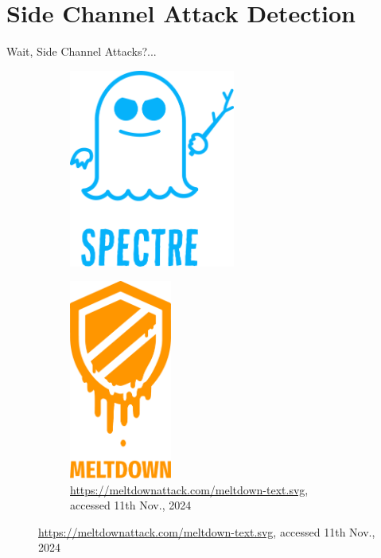 \documentclass[aspectratio=169]{beamer}
\begin{document}
\section{Side Channel Attack Detection}
\begin{frame}{Wait, Side Channel Attacks?...}
    \begin{figure}
        \begin{subfigure}[]{0.45\textwidth}
            \begin{center}
                \includegraphics[width=0.6\textwidth]{images/spectre.pdf}
            \end{center}
        \end{subfigure}
        \begin{subfigure}[]{0.45\textwidth}
            \begin{center}
                \includegraphics[width=0.37\textwidth]{images/meltdown.pdf}
            \end{center}
            \caption{\footnotesize{\url{https://meltdownattack.com/meltdown-text.svg}, accessed 11th Nov., 2024}}
        \end{subfigure}
    \end{figure}
\end{frame}
\end{document}
